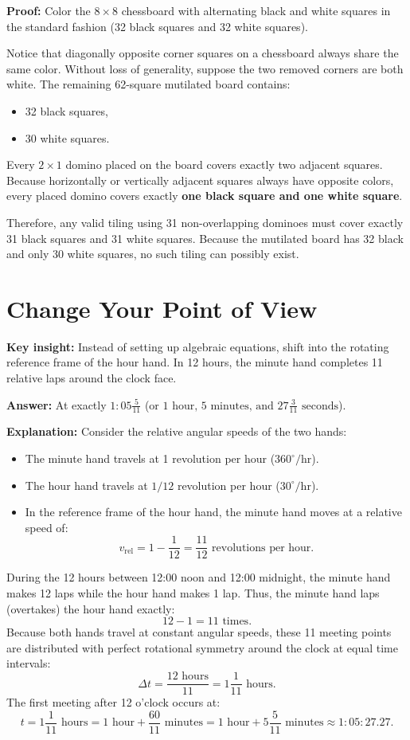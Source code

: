 \documentclass[12pt]{article}
\newcommand{\insight}[1]{\par\medskip\noindent\textbf{Key insight:} #1}
\begin{document}
\textbf{Proof:}
Color the $8 \times 8$ chessboard with alternating black and white squares in the standard fashion (32 black squares and 32 white squares).

Notice that diagonally opposite corner squares on a chessboard always share the same color. Without loss of generality, suppose the two removed corners are both white.
The remaining 62-square mutilated board contains:
\begin{itemize}
    \item 32 black squares,
    \item 30 white squares.
\end{itemize}
Every $2 \times 1$ domino placed on the board covers exactly two adjacent squares. Because horizontally or vertically adjacent squares always have opposite colors, every placed domino covers exactly \textbf{one black square and one white square}.

Therefore, any valid tiling using 31 non-overlapping dominoes must cover exactly 31 black squares and 31 white squares. Because the mutilated board has 32 black and only 30 white squares, no such tiling can possibly exist.

\section{Change Your Point of View}

\insight{Instead of setting up algebraic equations, shift into the rotating reference frame of the hour hand. In 12 hours, the minute hand completes 11 relative laps around the clock face.}

\textbf{Answer:} At exactly $1:05\frac{5}{11}$ (or $1\text{ hour, } 5\text{ minutes, and } 27\frac{3}{11}\text{ seconds}$).

\textbf{Explanation:}
Consider the relative angular speeds of the two hands:
\begin{itemize}
    \item The minute hand travels at 1 revolution per hour ($360^\circ/\text{hr}$).
    \item The hour hand travels at $1/12$ revolution per hour ($30^\circ/\text{hr}$).
    \item In the reference frame of the hour hand, the minute hand moves at a relative speed of:
    \[
    v_{\text{rel}} = 1 - \frac{1}{12} = \frac{11}{12} \text{ revolutions per hour}.
    \]
\end{itemize}
During the 12 hours between 12:00 noon and 12:00 midnight, the minute hand makes 12 laps while the hour hand makes 1 lap. Thus, the minute hand laps (overtakes) the hour hand exactly:
\[
12 - 1 = 11 \text{ times}.
\]
Because both hands travel at constant angular speeds, these 11 meeting points are distributed with perfect rotational symmetry around the clock at equal time intervals:
\[
\Delta t = \frac{12 \text{ hours}}{11} = 1\frac{1}{11} \text{ hours}.
\]
The first meeting after 12 o'clock occurs at:
\[
t = 1\frac{1}{11} \text{ hours} = 1 \text{ hour} + \frac{60}{11} \text{ minutes} = 1 \text{ hour} + 5\frac{5}{11} \text{ minutes} \approx 1:05:27.27.
\]
\end{document}
